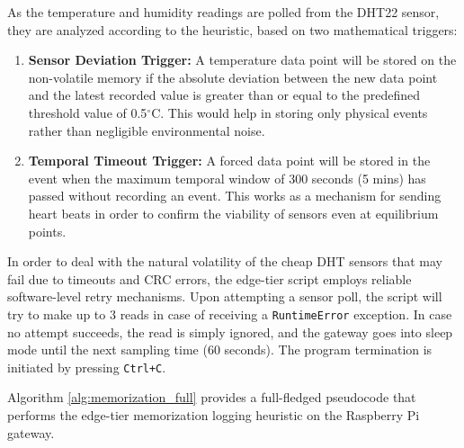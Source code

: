 As the temperature and humidity readings are polled from the DHT22 sensor, they are analyzed according to the heuristic, based on two mathematical triggers:
\begin{enumerate}
    \item \textbf{Sensor Deviation Trigger:} A temperature data point will be stored on the non-volatile memory if the absolute deviation between the new data point and the latest recorded value is greater than or equal to the predefined threshold value of 0.5$^\circ$C. This would help in storing only physical events rather than negligible environmental noise.
    \item \textbf{Temporal Timeout Trigger:} A forced data point will be stored in the event when the maximum temporal window of 300 seconds (5 mins) has passed without recording an event. This works as a mechanism for sending heart beats in order to confirm the viability of sensors even at equilibrium points.
\end{enumerate}

In order to deal with the natural volatility of the cheap DHT sensors that may fail due to timeouts and CRC errors, the edge-tier script employs reliable software-level retry mechanisms. Upon attempting a sensor poll, the script will try to make up to 3 reads in case of receiving a \texttt{RuntimeError} exception. In case no attempt succeeds, the read is simply ignored, and the gateway goes into sleep mode until the next sampling time (60 seconds). The program termination is initiated by pressing \texttt{Ctrl+C}.

Algorithm \ref{alg:memorization_full} provides a full-fledged pseudocode that performs the edge-tier memorization logging heuristic on the Raspberry Pi gateway.

